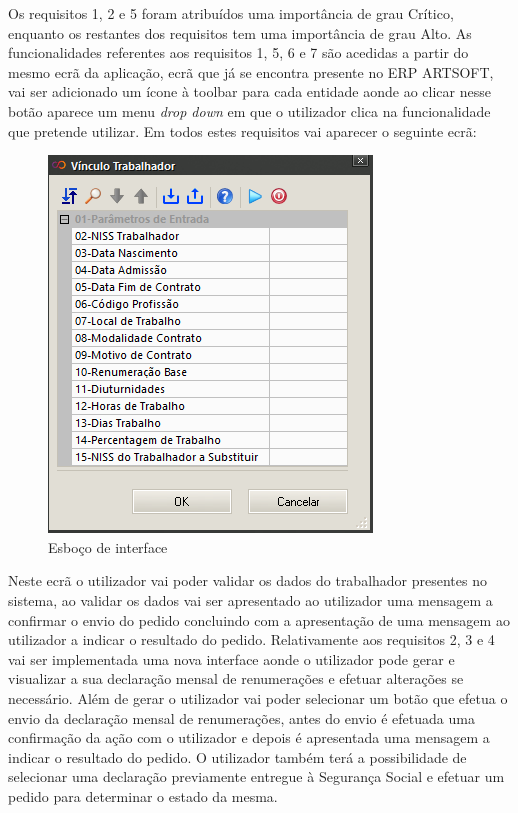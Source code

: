 \documentclass[sigplan]{acmart}
\begin{document}
Os requisitos 1, 2 e 5 foram atribuídos uma importância de grau Crítico, enquanto os restantes dos requisitos tem uma importância de grau Alto. As funcionalidades referentes aos requisitos 1, 5, 6 e 7 são acedidas a partir do mesmo ecrã da aplicação, ecrã que já se encontra presente no ERP ARTSOFT, vai ser adicionado um ícone à toolbar para cada entidade aonde ao clicar nesse botão aparece um menu \textit{drop down} em que o utilizador clica na funcionalidade que pretende utilizar. Em todos estes requisitos vai aparecer o seguinte ecrã:
\FloatBarrier
\begin{figure}[htbp]
	\centerline{\includegraphics[width=\linewidth]{figures/esboco_interface.png}}
	\caption{Esboço de interface}
	\label{fig4}
\end{figure}
\FloatBarrier
Neste ecrã o utilizador vai poder validar os dados do trabalhador presentes no sistema, ao validar os dados vai ser apresentado ao utilizador uma mensagem a confirmar o envio do pedido concluindo com a apresentação de uma mensagem ao utilizador a indicar o resultado do pedido. Relativamente aos requisitos 2, 3 e 4 vai ser implementada uma nova interface aonde o utilizador pode gerar e visualizar a sua declaração mensal de renumerações e efetuar alterações se necessário. Além de gerar o utilizador vai poder selecionar um botão que efetua o envio da declaração mensal de renumerações, antes do envio é efetuada uma confirmação da ação com o utilizador e depois é apresentada uma mensagem a indicar o resultado do pedido. O utilizador também terá a possibilidade de selecionar uma declaração previamente entregue à Segurança Social e efetuar um pedido para determinar o estado da mesma.
\end{document}
